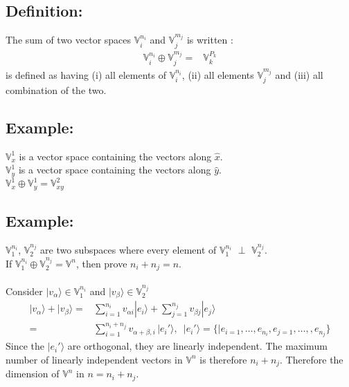 \documentclass[12pt]{article}
\begin{document}
\subsection*{Definition:}
The sum of two vector spaces $\mathbb{V}_i^{n_i}$ and $\mathbb{V}_j^{m_j}$ is written :
\begin{align*}
\mathbb{V}_i^{n_i} \oplus \mathbb{V}_j^{m_j} =& \mathbb{V}_k^{P_k}
\end{align*}
is defined as having (i) all elements of $\mathbb{V}_i^{n_i}$, (ii) all elements $\mathbb{V}_j^{m_j}$ and (iii) all combination of the two.
\subsection*{Example:}
$\mathbb{V}_x^1$ is a vector space containing the vectors along $\hat{x}$.\\
$\mathbb{V}_y^1$ is a vector space containing the vectors along $\hat{y}$.\\
$\mathbb{V}_x^1 \oplus \mathbb{V}_y^1 = \mathbb{V}_{xy}^2$
\subsection*{Example:}
$\mathbb{V}_1^{n_i}$, $\mathbb{V}_2^{n_j}$ are two subspaces where every element of $\mathbb{V}_1^{n_i}$ $\perp$ $\mathbb{V}_2^{n_j}$.\\
If $\mathbb{V}_1^{n_i} \oplus \mathbb{V}_2^{n_j} = \mathbb{V}^n$, then prove $n_i + n_j = n$.\\
\\
Consider $|v_\alpha \rangle \in \mathbb{V}_1^{n_i}$ and $|v_\beta \rangle \in \mathbb{V}_2^{n_j}$
\begin{align*}
|v_\alpha\rangle + |v_\beta\rangle =& \sum_{i=1}^{n_i} v_{\alpha i} |e_i\rangle + \sum_{j=1}^{n_j} v_{\beta j} |e_j\rangle 
\\
=& \sum_{i=1}^{n_i+n_j} v_{\alpha + \beta, i}\,|e_i'\rangle,\,\,\, 
|e_i'\rangle =  \lbrace |e_{i=1},\dots,e_{n_i},e_{j=1},\dots,,e_{n_j}\rbrace
\end{align*}
Since the $|e_i'\rangle$ are orthogonal, they are linearly independent. The maximum number of linearly independent vectors in $\mathbb{V}^n$ is therefore $n_i+n_j$. Therefore the dimension of $\mathbb{V}^n$ in $n = n_i+n_j$.
\end{document}
